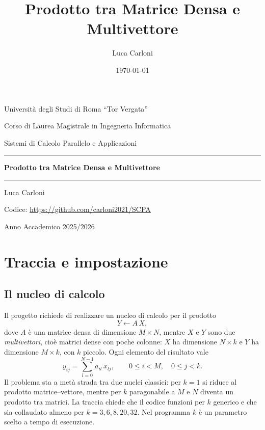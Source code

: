 \documentclass[11pt,a4paper]{article}
\title{Prodotto tra Matrice Densa e Multivettore}
\author{Luca Carloni}
\date{\today}
\newcommand{\repourl}{\url{https://github.com/carloni2021/SCPA}}
\begin{document}
\begin{titlepage}
  \centering
  {\large Università degli Studi di Roma ``Tor Vergata''\par}
  \vspace{0.3em}
  {\normalsize Corso di Laurea Magistrale in Ingegneria Informatica\par}

  \vspace{4cm}
  {\Large Sistemi di Calcolo Parallelo e Applicazioni\par}
  \vspace{1em}
  \rule{\textwidth}{0.4pt}\par\vspace{0.8em}
  {\huge\bfseries Prodotto tra Matrice Densa e Multivettore\par}
  \vspace{0.5em}
  \rule{\textwidth}{0.4pt}\par

  \vspace{3cm}
  {\large Luca Carloni\par}
  \vspace{0.5em}
  {\small Codice: \repourl\par}

  \vfill
  {\normalsize Anno Accademico 2025/2026\par}
\end{titlepage}
\tableofcontents
\newpage

\section{Traccia e impostazione}\label{sec:traccia}

\subsection{Il nucleo di calcolo}\label{sec:nucleo}

Il progetto richiede di realizzare un nucleo di calcolo per il prodotto
\[
  Y \leftarrow A\,X,
\]
dove $A$ è una matrice densa di dimensione $M \times N$, mentre $X$ e $Y$ sono
due \emph{multivettori}, cioè matrici dense con poche colonne: $X$ ha
dimensione $N \times k$ e $Y$ ha dimensione $M \times k$, con $k$ piccolo. Ogni
elemento del risultato vale
\[
  y_{ij} = \sum_{l=0}^{N-1} a_{il}\, x_{lj},
  \qquad 0 \le i < M,\quad 0 \le j < k .
\]
Il problema sta a metà strada tra due nuclei classici: per $k = 1$ si riduce
al prodotto matrice--vettore, mentre per $k$ paragonabile a $M$ e $N$ diventa
un prodotto tra matrici. La traccia chiede che il codice funzioni per $k$
generico e che sia collaudato almeno per $k = 3, 6, 8, 20, 32$. Nel programma
$k$ è un parametro scelto a tempo di esecuzione.
\end{document}
